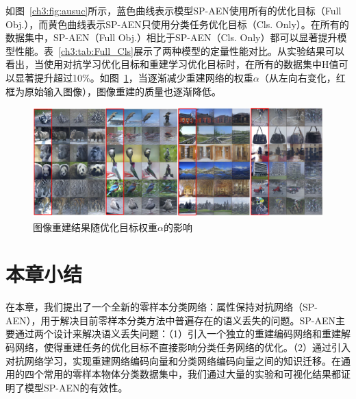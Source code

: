 \begin{table}[t]
\centering
{}
\caption{SP-AEN在不同优化目标条件下的性能对比}
\label{ch3:tab:Full_Cls}
\end{table}

如图~\ref{ch3:fig:ausuc}所示，蓝色曲线表示模型SP-AEN使用所有的优化目标（Full Obj.），而黄色曲线表示SP-AEN只使用分类任务优化目标（Cls. Only）。在所有的数据集中，SP-AEN（Full Obj.）相比于SP-AEN（Cls. Only）都可以显著提升模型性能。表~\ref{ch3:tab:Full_Cls}展示了两种模型的定量性能对比。从实验结果可以看出，当使用对抗学习优化目标和重建学习优化目标时，在所有的数据集中H值可以显著提升超过10\%。如图~\ref{ch3:fig:alpha_influence}，当逐渐减少重建网络的权重$\alpha$（从左向右变化，红框为原始输入图像），图像重建的质量也逐渐降低。

\begin{figure}[t]
    \centering
    \includegraphics[width=0.99\linewidth]{chapter3/res/alpha_influence.pdf}
    \caption{图像重建结果随优化目标权重$\alpha$的影响}
\label{ch3:fig:alpha_influence}
\end{figure}


\section{本章小结}

在本章，我们提出了一个全新的零样本分类网络：属性保持对抗网络（SP-AEN），用于解决目前零样本分类方法中普遍存在的语义丢失的问题。SP-AEN主要通过两个设计来解决语义丢失问题：（1）引入一个独立的重建编码网络和重建解码网络，使得重建任务的优化目标不直接影响分类任务网络的优化。（2）通过引入对抗网络学习，实现重建网络编码向量和分类网络编码向量之间的知识迁移。在通用的四个常用的零样本物体分类数据集中，我们通过大量的实验和可视化结果都证明了模型SP-AEN的有效性。


